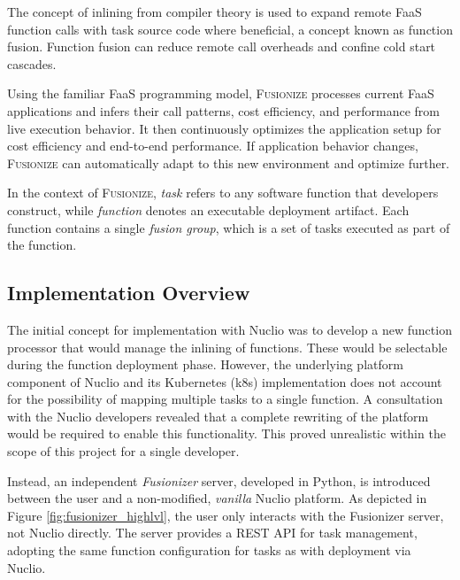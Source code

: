 The concept of inlining from compiler theory is used to expand remote FaaS
function calls with task source code where beneficial, a concept known as
function fusion. Function fusion can reduce remote call overheads and confine
cold start cascades.

Using the familiar FaaS programming model, \textsc{Fusionize} processes current
FaaS applications and infers their call patterns, cost efficiency, and
performance from live execution behavior. It then continuously optimizes the
application setup for cost efficiency and end-to-end performance. If application
behavior changes, \textsc{Fusionize} can automatically adapt to this new
environment and optimize further.

In the context of \textsc{Fusionize}, \emph{task} refers to any software
function that developers construct, while \emph{function} denotes an executable
deployment artifact. Each function contains a single \emph{fusion group}, which
is a set of tasks executed as part of the function.

\subsection{Implementation Overview}

The initial concept for implementation with Nuclio was to develop a new function
processor that would manage the inlining of functions. These would be selectable
during the function deployment phase. However, the underlying platform component
of Nuclio and its Kubernetes (k8s) implementation does not account for the
possibility of mapping multiple tasks to a single function. A consultation with
the Nuclio developers revealed that a complete rewriting of the platform would
be required to enable this functionality. This proved unrealistic within the
scope of this project for a single developer.

Instead, an independent \emph{Fusionizer} server, developed in Python, is
introduced between the user and a non-modified, \emph{vanilla} Nuclio platform.
As depicted in Figure \ref{fig:fusionizer_highlvl}, the user only interacts with
the Fusionizer server, not Nuclio directly. The server provides a REST API for
task management, adopting the same function configuration for tasks as with
deployment via Nuclio.

